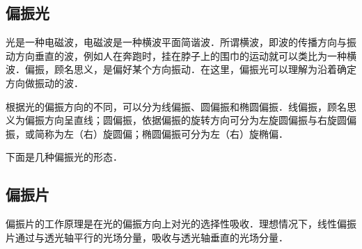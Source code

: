 
\subsection{偏振光}

光是一种电磁波，电磁波是一种横波平面简谐波．所谓横波，即波的传播方向与振动方向垂直的波，例如人在奔跑时，挂在脖子上的围巾的运动就可以类比为一种横波．偏振，顾名思义，是偏好某个方向振动．在这里，偏振光可以理解为沿着确定方向做振动的波．

根据光的偏振方向的不同，可以分为线偏振、圆偏振和椭圆偏振．线偏振，顾名思义为偏振方向呈直线；圆偏振，依据偏振的旋转方向可分为左旋圆偏振与右旋圆偏振，或简称为左（右）旋圆偏；椭圆偏振可分为左（右）旋椭偏．

下面是几种偏振光的形态．


\subsection{偏振片}
偏振片的工作原理是在光的偏振方向上对光的选择性吸收．理想情况下，线性偏振片通过与透光轴平行的光场分量，吸收与透光轴垂直的光场分量．

